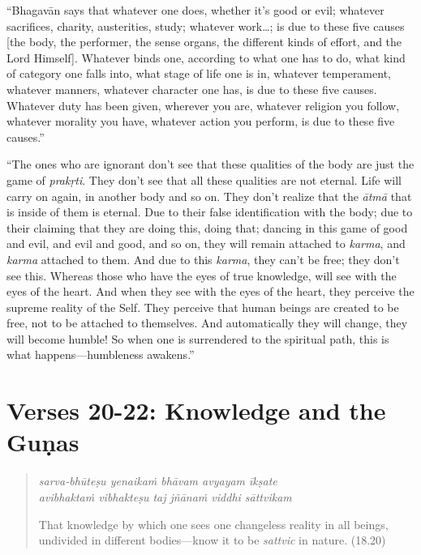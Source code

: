 \documentclass[12pt, twoside, openright]{memoir}
\begin{document}
\enquote{Bhagavān says that whatever one does, whether it’s good or evil; whatever sacrifices, charity, austerities, study; whatever work\ldots; is due to these five causes [the body, the performer, the sense organs, the different kinds of effort, and the Lord Himself]. Whatever binds one, according to what one has to do, what kind of category one falls into, what stage of life one is in, whatever temperament, whatever manners, whatever character one has, is due to these five causes. Whatever duty has been given, wherever you are, whatever religion you follow, whatever morality you have, whatever action you perform, is due to these five causes.}

\enquote{The ones who are ignorant don’t see that these qualities of the body are just the game of \textit{prakṛti}. They don’t see that all these qualities are not eternal. Life will carry on again, in another body and so on. They don’t realize that the \textit{ātmā} that is inside of them is eternal. Due to their false identification with the body; due to their claiming that they are doing this, doing that; dancing in this game of good and evil, and evil and good, and so on, they will remain attached to \textit{karma}, and \textit{karma} attached to them. And due to this \textit{karma}, they can’t be free; they don’t see this. Whereas those who have the eyes of true knowledge, will see with the eyes of the heart. And when they see with the eyes of the heart, they perceive the supreme reality of the Self. They perceive that human beings are created to be free, not to be attached to themselves. And automatically they will change, they will become humble! So when one is surrendered to the spiritual path, this is what happens---humbleness awakens.}

\section{Verses 20-22: Knowledge and the Guṇas}\label{sec-verses-20-22-knowledge-and-the-gunas}


\par
\begin{verse}
\textit{sarva-bhūteṣu yenaikaṁ bhāvam avyayam īkṣate} \\
\textit{avibhaktaṁ vibhakteṣu taj jñānaṁ viddhi sāttvikam}

\noindent That knowledge by which one sees one changeless reality in all beings, undivided in different bodies---know it to be \textit{sattvic} in nature. (18.20)
\end{verse}
\par
\end{document}
